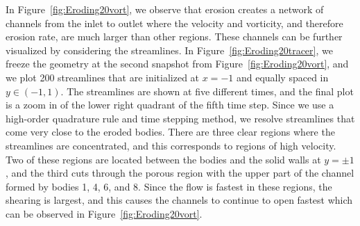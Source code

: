 \documentclass[preprint,10pt]{elsarticle}
\begin{document}
In Figure~\ref{fig:Eroding20vort}, we observe that erosion creates a
network of channels from the inlet to outlet where the velocity and
vorticity, and therefore erosion rate, are much larger than other
regions.  These channels can be further visualized by considering the
streamlines.  In Figure~\ref{fig:Eroding20tracer}, we freeze the
geometry at the second snapshot from Figure~\ref{fig:Eroding20vort}, and
we plot 200 streamlines that are initialized at $x=-1$ and equally
spaced in $y \in (-1,1)$.  The streamlines are shown at five different
times, and the final plot is a zoom in of the lower right quadrant of
the fifth time step.  Since we use a high-order quadrature rule and time
stepping method, we resolve streamlines that come very close to the
eroded bodies.  There are three clear regions where the streamlines are
concentrated, and this corresponds to regions of high velocity.  Two of
these regions are located between the bodies and the solid walls at
$y=\pm 1$, and the third cuts through the porous region with the upper
part of the channel formed by bodies 1, 4, 6, and 8.  Since the flow is
fastest in these regions, the shearing is largest, and this causes the
channels to continue to open fastest which can be observed in
Figure~\ref{fig:Eroding20vort}.
\end{document}

